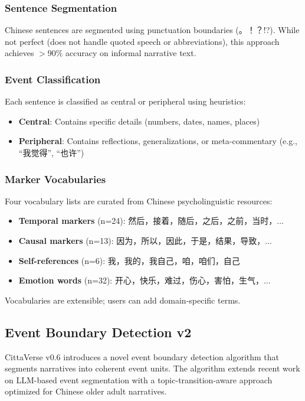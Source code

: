 \documentclass[11pt]{article}
\begin{document}
\subsubsection{Sentence Segmentation}
Chinese sentences are segmented using punctuation boundaries (。！？!?). While not perfect (does not handle quoted speech or abbreviations), this approach achieves $>90\%$ accuracy on informal narrative text.

\subsubsection{Event Classification}
Each sentence is classified as central or peripheral using heuristics:
\begin{itemize}
    \item \textbf{Central}: Contains specific details (numbers, dates, names, places)
    \item \textbf{Peripheral}: Contains reflections, generalizations, or meta-commentary (e.g., ``我觉得'', ``也许'')
\end{itemize}

\subsubsection{Marker Vocabularies}
Four vocabulary lists are curated from Chinese psycholinguistic resources:
\begin{itemize}
    \item \textbf{Temporal markers} (n=24): 然后，接着，随后，之后，之前，当时，...
    \item \textbf{Causal markers} (n=13): 因为，所以，因此，于是，结果，导致，...
    \item \textbf{Self-references} (n=6): 我，我的，我自己，咱，咱们，自己
    \item \textbf{Emotion words} (n=32): 开心，快乐，难过，伤心，害怕，生气，...
\end{itemize}

Vocabularies are extensible; users can add domain-specific terms.

\subsection{Event Boundary Detection v2}
\label{sec:event-boundary}

CittaVerse v0.6 introduces a novel event boundary detection algorithm that segments narratives into coherent event units. The algorithm extends recent work on LLM-based event segmentation \citep{llm_narrative_seg2023,llm_event_seg2025} with a topic-transition-aware approach optimized for Chinese older adult narratives.
\end{document}
